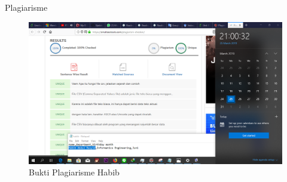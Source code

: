 \begin {enumerate}
Plagiarisme
\begin{figure}[h]
\centering
\includegraphics[scale=0.2]{figures/4/1174002/plagiarism_habib.png}
\caption{Bukti Plagiarisme Habib}
\label{fig:plagiarisme}
\end{figure}
\end{enumerate}

